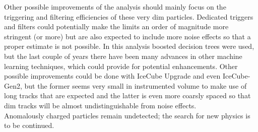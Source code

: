 \noindent Other possible improvements of the analysis should mainly focus on the triggering and filtering efficiencies of these very dim particles. Dedicated triggers and filters could potentially make the limits an order of magnitude more stringent (or more) but are also expected to include more noise effects so that a proper estimate is not possible. In this analysis boosted decision trees were used, but the last couple of years there have been many advances in other machine learning techniques, which could provide for potential enhancements.
Other possible improvements could be done with IceCube Upgrade and even IceCube-Gen2, but the former seems very small in instrumented volume to make use of long tracks that are expected and the latter is even more coarsly spaced so that dim tracks will be almost undistinguishable from noise effects.\\

\noindent Anomalously charged particles remain undetected; the search for new physics is to be continued.